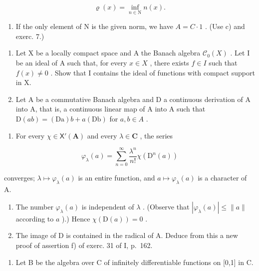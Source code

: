 \[
\varrho (x) = \inf _ {n \in \mathrm{N}} n (x).
\]

\begin{enumerate}
\def\labelenumi{\alph{enumi})}
\setcounter{enumi}{3}
\tightlist
\item
  If the only element of N is the given norm, we have \(A = C \cdot 1\) . (Use c) and exerc. 7.)
\end{enumerate}

\begin{enumerate}
\def\labelenumi{\arabic{enumi})}
\setcounter{enumi}{8}
\item
  Let X be a locally compact space and A the Banach algebra \(\mathcal{C}_{0}(X)\) . Let I be an ideal of A such that, for every \(x \in X\) , there exists \(f \in I\) such that \(f(x) \neq 0\) . Show that I contains the ideal of functions with compact support in X.
\item
  Let A be a commutative Banach algebra and D a continuous derivation of A into A, that is, a continuous linear map of A into A such that \(\mathrm{D}(ab)=(\mathrm{Da})b+a(\mathrm{Db})\) for \(a,b\in A\) .
\end{enumerate}

\begin{enumerate}
\def\labelenumi{\alph{enumi})}
\tightlist
\item
  For every \(\chi \in \mathsf{X}'(\mathbf{A})\) and every \(\lambda \in \mathbf{C}\) , the series
\end{enumerate}

\[
\varphi_ {\lambda} (a) = \sum_ {n = 0} ^ {\infty} \frac {\lambda^ {n}}{n !} \chi (\mathrm{D} ^ {n} (a))
\]

converges; \(\lambda \mapsto \varphi_{\lambda}(a)\) is an entire function, and \(a \mapsto \varphi_{\lambda}(a)\) is a character of A.

\begin{enumerate}
\def\labelenumi{\alph{enumi})}
\setcounter{enumi}{1}
\item
  The number \(\varphi_{\lambda}(a)\) is independent of \(\lambda\) . (Observe that \(|\varphi_{\lambda}(a)| \leqslant \|a\|\) according to \(a\) ).) Hence \(\chi(\mathrm{D}(a)) = 0\) .
\item
  The image of D is contained in the radical of A. Deduce from this a new proof of assertion f) of exerc. 31 of I, p.~162.
\end{enumerate}

\begin{enumerate}
\def\labelenumi{\arabic{enumi})}
\setcounter{enumi}{10}
\tightlist
\item
  Let B be the algebra over C of infinitely differentiable functions on {[}0,1{]} in C.
\end{enumerate}

